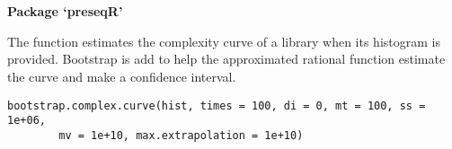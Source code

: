 \documentclass[letterpaper]{book}
\begin{document}
\chapter*{}
\begin{center}
{\textbf{\huge Package `preseqR'}}
\par\bigskip{\large \today}
\end{center}
\begin{description}
\raggedright{}
\item[Type]
\item[Title]
\item[Version]
\item[Date]
\item[Author]
\item[Maintainer]\AsIs{}
\item[Description]
\item[License]
\item[Keyword]
\end{description}
%
\begin{Description}\relax
The function estimates the complexity curve of a library when its histogram
is provided. Bootstrap is add to help the approximated rational function 
estimate the curve and make a confidence interval.
\end{Description}
%
\begin{Usage}
\begin{verbatim}
bootstrap.complex.curve(hist, times = 100, di = 0, mt = 100, ss = 1e+06, 
		mv = 1e+10, max.extrapolation = 1e+10)
\end{verbatim}
\end{Usage}
%
\end{document}
